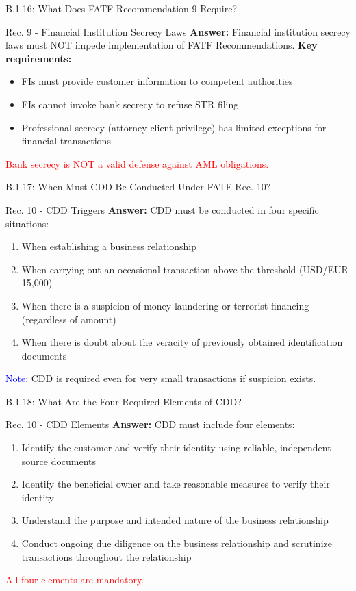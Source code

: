 \documentclass{beamer}
\begin{document}
	\begin{frame}{B.1.16: What Does FATF Recommendation 9 Require?}
		\begin{block}{Rec. 9 - Financial Institution Secrecy Laws}
			\textbf{Answer:} Financial institution secrecy laws must NOT impede implementation of FATF Recommendations.
			\vspace{0.2cm}
			\textbf{Key requirements:}
			\begin{itemize}
				\item FIs must provide customer information to competent authorities
				\item FIs cannot invoke bank secrecy to refuse STR filing
				\item Professional secrecy (attorney-client privilege) has limited exceptions for financial transactions
			\end{itemize}
			\textcolor{red}{Bank secrecy is NOT a valid defense against AML obligations.}
		\end{block}
	\end{frame}
	
	\begin{frame}{B.1.17: When Must CDD Be Conducted Under FATF Rec. 10?}
		\begin{block}{Rec. 10 - CDD Triggers}
			\textbf{Answer:} CDD must be conducted in four specific situations:
			\begin{enumerate}
				\item When establishing a business relationship
				\item When carrying out an occasional transaction above the threshold (USD/EUR 15,000)
				\item When there is a suspicion of money laundering or terrorist financing (regardless of amount)
				\item When there is doubt about the veracity of previously obtained identification documents
			\end{enumerate}
			\textcolor{blue}{Note:} CDD is required even for very small transactions if suspicion exists.
		\end{block}
	\end{frame}
	
	\begin{frame}{B.1.18: What Are the Four Required Elements of CDD?}
		\begin{block}{Rec. 10 - CDD Elements}
			\textbf{Answer:} CDD must include four elements:
			\begin{enumerate}
				\item Identify the customer and verify their identity using reliable, independent source documents
				\item Identify the beneficial owner and take reasonable measures to verify their identity
				\item Understand the purpose and intended nature of the business relationship
				\item Conduct ongoing due diligence on the business relationship and scrutinize transactions throughout the relationship
			\end{enumerate}
			\textcolor{red}{All four elements are mandatory.}
		\end{block}
	\end{frame}
	
\end{document}
